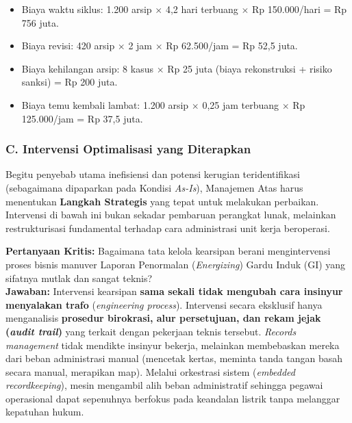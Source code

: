 \documentclass[12pt,a4paper]{report}
\begin{document}
\begin{plnbox}
\small
\begin{itemize}[nosep, leftmargin=*]
    \item Biaya waktu siklus: 1.200 arsip $\times$ 4,2 hari terbuang $\times$ Rp 150.000/hari = Rp 756 juta.
    \item Biaya revisi: 420 arsip $\times$ 2 jam $\times$ Rp 62.500/jam = Rp 52,5 juta.
    \item Biaya kehilangan arsip: 8 kasus $\times$ Rp 25 juta (biaya rekonstruksi + risiko sanksi) = Rp 200 juta.
    \item Biaya temu kembali lambat: 1.200 arsip $\times$ 0,25 jam terbuang $\times$ Rp 125.000/jam = Rp 37,5 juta.
\end{itemize}
\end{plnbox}

\subsubsection*{C. Intervensi Optimalisasi yang Diterapkan}
Begitu penyebab utama inefisiensi dan potensi kerugian teridentifikasi (sebagaimana dipaparkan pada Kondisi \textit{As-Is}), Manajemen Atas harus menentukan \textbf{Langkah Strategis} yang tepat untuk melakukan perbaikan. Intervensi di bawah ini bukan sekadar pembaruan perangkat lunak, melainkan restrukturisasi fundamental terhadap cara administrasi unit kerja beroperasi. 

\begin{warnbox}
\small
\textbf{Pertanyaan Kritis:} Bagaimana tata kelola kearsipan berani mengintervensi proses bisnis manuver Laporan Penormalan (\textit{Energizing}) Gardu Induk (GI) yang sifatnya mutlak dan sangat teknis?
\\ \textbf{Jawaban:} Intervensi kearsipan \textbf{sama sekali tidak mengubah cara insinyur menyalakan trafo} (\textit{engineering process}). Intervensi secara eksklusif hanya menganalisis \textbf{prosedur birokrasi, alur persetujuan, dan rekam jejak (\textit{audit trail})} yang terkait dengan pekerjaan teknis tersebut. \textit{Records management} tidak mendikte insinyur bekerja, melainkan membebaskan mereka dari beban administrasi manual (mencetak kertas, meminta tanda tangan basah secara manual, merapikan map). Melalui orkestrasi sistem (\textit{embedded recordkeeping}), mesin mengambil alih beban administratif sehingga pegawai operasional dapat sepenuhnya berfokus pada keandalan listrik tanpa melanggar kepatuhan hukum.
\end{warnbox}
\end{document}
